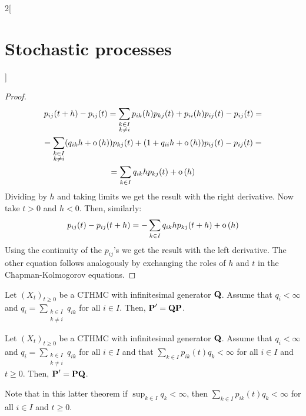 \documentclass[../../../main_math.tex]{subfiles}
\begin{document}
\begin{multicols}{2}[\section{Stochastic processes}]
\begin{proof}
    \begin{multline*}
      p_{ij}(t+h)-p_{ij}(t)=\sum_{\substack{k\in I\\k\ne i}}p_{ik}(h)p_{kj}(t)+p_{ii}(h)p_{ij}(t)-p_{ij}(t)=\\=\sum_{\substack{k\in I\\k\ne i}}(q_{ik}h+\mathrm{o}\left(h\right))p_{kj}(t)+(1+q_{ii} h+\mathrm{o}\left(h\right))p_{ij}(t)-p_{ij}(t)=\\=\sum_{k\in I}q_{ik}h p_{kj}(t)+\mathrm{o}\left(h\right)
    \end{multline*}
    Dividing by $h$ and taking limits we get the result with the right derivative. Now take $t>0$ and $h<0$. Then, similarly:
    $$
      p_{ij}(t)-p_{ij}(t+h)=-\sum_{k\in I}q_{ik}h p_{kj}(t+h)+\mathrm{o}\left(h\right)
    $$
    Using the continuity of the $p_{ij}$'s we get the result with the left derivative. The other equation follows analogously by exchanging the roles of $h$ and $t$ in the Chapman-Kolmogorov equations.
  \end{proof}
  \begin{theorem}
    Let ${(X_t)}_{t\geq 0}$ be a CTHMC with infinitesimal generator $\boldsymbol{\mathrm{Q}}$. Assume that $q_i<\infty$ and $q_i=\sum_{\substack{k\in I\\k\ne i}}q_{ik}$ for all $i\in I$. Then, $\boldsymbol{\mathrm{P}}'=\boldsymbol{\mathrm{Q}}\boldsymbol{\mathrm{P}}$.
  \end{theorem}
  \begin{theorem}
    Let ${(X_t)}_{t\geq 0}$ be a CTHMC with infinitesimal generator $\boldsymbol{\mathrm{Q}}$. Assume that $q_i<\infty$ and $q_i=\sum_{\substack{k\in I\\k\ne i}}q_{ik}$ for all $i\in I$ and that $\sum_{k\in I}p_{ik}(t)q_k<\infty$ for all $i\in I$ and $t\geq 0$. Then, $\boldsymbol{\mathrm{P}}'=\boldsymbol{\mathrm{P}}\boldsymbol{\mathrm{Q}}$.
  \end{theorem}
  \begin{remark}
    Note that in this latter theorem if $\sup_{k\in I}q_k<\infty$, then $\sum_{k\in I}p_{ik}(t)q_k<\infty$ for all $i\in I$ and $t\geq 0$.
  \end{remark}

\end{multicols}
\end{document}
